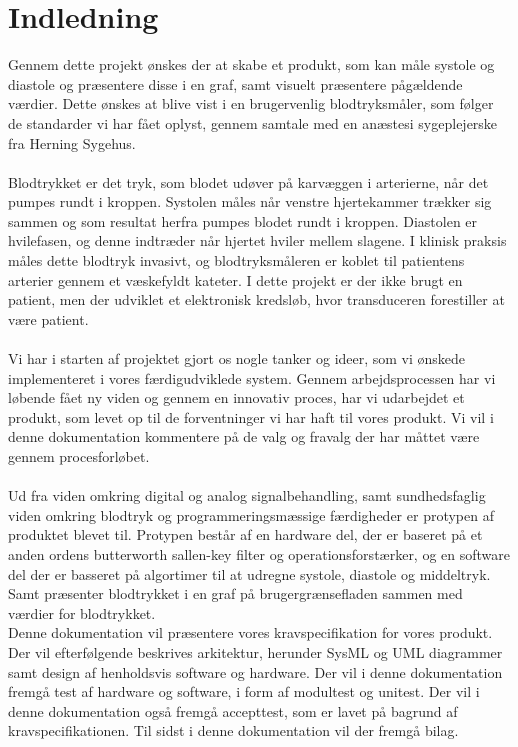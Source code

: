 \chapter{Indledning}
Gennem dette projekt ønskes der at skabe et produkt, som kan måle systole og diastole og præsentere disse i en graf, samt visuelt præsentere pågældende værdier. Dette ønskes at blive vist i en brugervenlig blodtryksmåler, som følger de standarder vi har fået oplyst, gennem samtale med en anæstesi sygeplejerske fra Herning Sygehus. 
\\\\
Blodtrykket er det tryk, som blodet udøver på karvæggen i arterierne, når det pumpes rundt i kroppen. Systolen måles når venstre hjertekammer trækker sig sammen og som resultat herfra pumpes blodet rundt i kroppen. Diastolen er hvilefasen, og denne indtræder når hjertet hviler mellem slagene. I klinisk praksis måles dette blodtryk invasivt, og blodtryksmåleren er koblet til patientens arterier gennem et væskefyldt kateter. I dette projekt er der ikke brugt en patient, men der udviklet et elektronisk kredsløb, hvor transduceren forestiller at være patient.
\\\\
Vi har i starten af projektet gjort os nogle tanker og ideer, som vi ønskede implementeret i vores færdigudviklede system. Gennem arbejdsprocessen har vi løbende fået ny viden og gennem en innovativ proces, har vi udarbejdet et produkt, som levet op til de forventninger vi har haft til vores produkt. Vi vil i denne dokumentation kommentere på de valg og fravalg der har måttet være gennem procesforløbet.  
\\\\
Ud fra viden omkring digital og analog signalbehandling, samt sundhedsfaglig viden omkring blodtryk og programmeringsmæssige færdigheder er protypen af produktet blevet til. Protypen består af en hardware del, der er baseret på et anden ordens butterworth sallen-key filter og operationsforstærker, og en software del der er basseret på algortimer til at udregne systole, diastole og middeltryk. Samt præsenter blodtrykket i en graf på brugergrænsefladen sammen med værdier for blodtrykket.\\
Denne dokumentation vil præsentere vores kravspecifikation for vores produkt. Der vil efterfølgende beskrives arkitektur, herunder SysML og UML diagrammer samt design af henholdsvis software og hardware. Der vil i denne dokumentation fremgå test af hardware og software, i form af modultest og unitest. Der vil i denne dokumentation også fremgå accepttest, som er lavet på bagrund af kravspecifikationen. Til sidst i denne dokumentation vil der fremgå bilag. 
